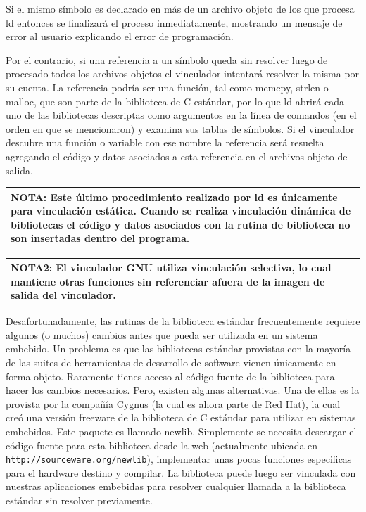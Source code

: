 \documentclass[output=paper, 
colorlinks,
citecolor=brown,
newtxmath
]{langscibook}
\begin{document}
Si el mismo símbolo es declarado en más de un archivo objeto de los que 
procesa ld entonces se finalizará el proceso inmediatamente, mostrando un mensaje
de error al usuario explicando el error de programación.

Por el contrario, si una referencia a un símbolo queda sin resolver luego de
procesado todos los archivos objetos el vinculador intentará resolver la misma
por su cuenta.
La referencia podría ser una función, tal como memcpy, strlen o malloc, que son
parte de la biblioteca de C estándar, por lo que ld abrirá cada uno de las
bibliotecas descriptas como argumentos en la línea de comandos (en el orden
en que se mencionaron) y examina sus tablas de símbolos. 
Si el vinculador descubre una función o variable con ese nombre la referencia
será resuelta agregando el código y datos asociados a esta referencia en el 
archivos objeto de salida.

\begin{center}
\begin{tabularx}{\textwidth}{|X|}
\hline
\rowcolor{lightgray}
\textbf{NOTA: Este último procedimiento realizado por ld es únicamente para vinculación
estática. Cuando se realiza vinculación dinámica de bibliotecas el código 
y datos asociados con la rutina de biblioteca no son insertadas dentro
del programa.}\\
\hline
\end{tabularx}
\end{center}

\begin{center}
\begin{tabularx}{\textwidth}{|X|}
\hline
\rowcolor{lightgray}
\textbf{NOTA2: El vinculador GNU utiliza vinculación selectiva, lo cual mantiene
otras funciones sin referenciar afuera de la imagen de salida
del vinculador.}\\
\hline
\end{tabularx}
\end{center}

Desafortunadamente, las rutinas de la biblioteca estándar frecuentemente requiere 
algunos (o muchos) cambios antes que pueda ser utilizada en un sistema embebido.
Un problema es que las bibliotecas estándar provistas con la mayoría de las 
suites de herramientas de desarrollo de software vienen únicamente en forma objeto.
Raramente tienes acceso al código fuente de la biblioteca para hacer los 
cambios necesarios. Pero, existen algunas alternativas. Una de ellas es
la provista por la compañía Cygnus (la cual es ahora parte de Red Hat),
la cual creó una versión freeware de la biblioteca de C estándar para utilizar 
en sistemas embebidos.
Este paquete es llamado newlib. Simplemente se necesita descargar el código fuente
para esta biblioteca desde la web (actualmente ubicada en \texttt{http://sourceware.org/newlib}),
implementar unas pocas funciones especificas para el hardware destino y compilar.
La biblioteca puede luego ser vinculada con nuestras aplicaciones embebidas
para resolver cualquier llamada a la biblioteca estándar sin resolver previamente.
\end{document}
